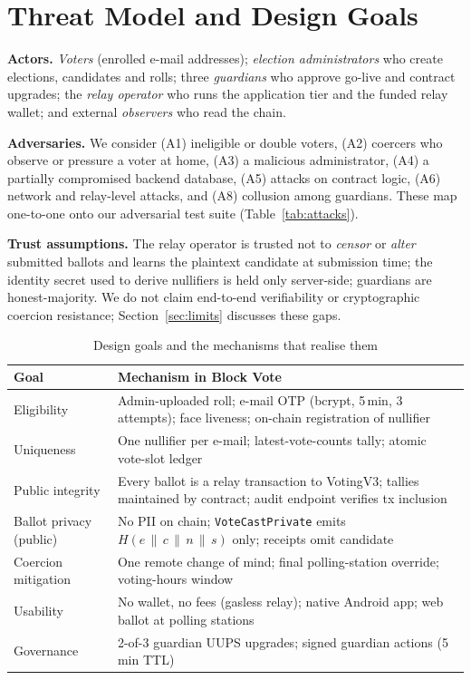 \documentclass[conference]{IEEEtran}
\newcommand{\code}[1]{\texttt{\small #1}}
\begin{document}
\section{Threat Model and Design Goals}
\label{sec:threat}

\textbf{Actors.} \emph{Voters} (enrolled e-mail addresses); \emph{election administrators} who create elections, candidates and rolls; three \emph{guardians} who approve go-live and contract upgrades; the \emph{relay operator} who runs the application tier and the funded relay wallet; and external \emph{observers} who read the chain.

\textbf{Adversaries.} We consider (A1) ineligible or double voters, (A2) coercers who observe or pressure a voter at home, (A3) a malicious administrator, (A4) a partially compromised backend database, (A5) attacks on contract logic, (A6) network and relay-level attacks, and (A8) collusion among guardians. These map one-to-one onto our adversarial test suite (Table~\ref{tab:attacks}).

\textbf{Trust assumptions.} The relay operator is trusted not to \emph{censor} or \emph{alter} submitted ballots and learns the plaintext candidate at submission time; the identity secret used to derive nullifiers is held only server-side; guardians are honest-majority. We do not claim end-to-end verifiability or cryptographic coercion resistance; Section~\ref{sec:limits} discusses these gaps.

\begin{table}[t]
\caption{Design goals and the mechanisms that realise them}
\label{tab:goals}
\centering
\footnotesize
\begin{tabular}{@{}p{2.05cm}p{5.95cm}@{}}
\toprule
\textbf{Goal} & \textbf{Mechanism in Block Vote} \\
\midrule
Eligibility & Admin-uploaded roll; e-mail OTP (bcrypt, 5\,min, 3 attempts); face liveness; on-chain registration of nullifier \\
Uniqueness & One nullifier per e-mail; latest-vote-counts tally; atomic vote-slot ledger \\
Public integrity & Every ballot is a relay transaction to VotingV3; tallies maintained by contract; audit endpoint verifies tx inclusion \\
Ballot privacy (public) & No PII on chain; \code{VoteCastPrivate} emits $H(e\,\|\,c\,\|\,n\,\|\,s)$ only; receipts omit candidate \\
Coercion mitigation & One remote change of mind; final polling-station override; voting-hours window \\
Usability & No wallet, no fees (gasless relay); native Android app; web ballot at polling stations \\
Governance & 2-of-3 guardian UUPS upgrades; signed guardian actions (5\,min TTL) \\
\bottomrule
\end{tabular}
\end{table}
\end{document}
